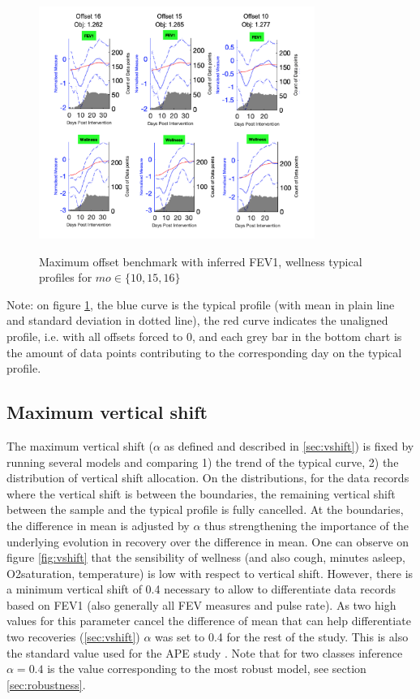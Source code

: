\begin{figure}[!h]
    \caption{Maximum offset benchmark with inferred FEV1, wellness typical profiles for $mo \in \{10, 15, 16\}$ }
    \centering
    \includegraphics[width=90mm]{images/offsets1.png}
    \label{fig:offsets}
\end{figure} 
Note: on figure \ref{fig:offsets}, the blue curve is the typical profile (with mean in plain line and standard deviation in dotted line), the red curve indicates the unaligned profile, i.e. with all offsets forced to 0, and each grey bar in the bottom chart is the amount of data points contributing to the corresponding day on the typical profile.

\subsection{Maximum vertical shift}
The maximum vertical shift ($\alpha$ as defined and described in \ref{sec:vshift}) is fixed by running several models and comparing 1) the trend of the typical curve, 2) the distribution of vertical shift allocation. On the distributions, for the data records where the vertical shift is between the boundaries, the remaining vertical shift between the sample and the typical profile is fully cancelled. At the boundaries, the difference in mean is adjusted by $\alpha$ thus strengthening the importance of the underlying evolution in recovery over the difference in mean.
One can observe on figure \ref{fig:vshift} that the sensibility of  wellness (and also cough, minutes asleep, O2saturation, temperature) is low with respect to vertical shift. However, there is a minimum vertical shift of 0.4 necessary to allow to differentiate data records based on FEV1 (also generally all FEV measures and pulse rate). As two high values for this parameter cancel the difference of mean that can help differentiate two recoveries (\ref{sec:vshift}) $\alpha$ was set to 0.4 for the rest of the study. This is also the standard value used for the APE study \cite{damian}. Note that for two classes inference  $\alpha = 0.4$ is the value corresponding to the most robust model, see section \ref{sec:robustness}.

